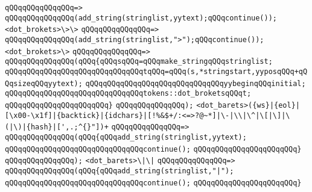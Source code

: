 \verb|qQQqqQQqqQQqqQQq=>|\newline
\verb|qQQqqQQqqQQqqQQq(add_string(stringlist,yytext);qQQqcontinue());|\newline
\newline
\verb|<dot_brokets>\>\>|\newline
\verb|qQQqqQQqqQQqqQQq=>|\newline
\verb|qQQqqQQqqQQqqQQq(add_string(stringlist,">");qQQqcontinue());|\newline
\newline
\verb|<dot_brokets>\>|\newline
\verb|qQQqqQQqqQQqqQQq=>|\newline
\verb|qQQqqQQqqQQqqQQq(qQQq{qQQqsqQQq=qQQqmake_stringqQQqstringlist;|\newline
\verb|qQQqqQQqqQQqqQQqqQQqqQQqqQQqqQQqtqQQq=qQQq(s,*stringstart,yyposqQQq+qQQqsizeqQQqyytext);|\newline
\verb|qQQqqQQqqQQqqQQqqQQqqQQqqQQqqQQqyybeginqQQqinitial;|\newline
\verb|qQQqqQQqqQQqqQQqqQQqqQQqqQQqqQQqtokens::dot_broketsqQQqt;|\newline
\verb|qQQqqQQqqQQqqQQqqQQqqQQq}|\newline
\verb|qQQqqQQqqQQqqQQq);|\newline
\newline
\newline
\newline
\verb|<dot_barets>({ws}|\verb#|{eol}|[\x00-\x1f]|{backtick}|{idchars}|[!%&$+/:<=>?@~*]|\-|\\|\^|\[|\]|\(|\)|{hash}|[',.;^{}"])+#\newline
\verb|qQQqqQQqqQQqqQQq=>|\newline
\verb|qQQqqQQqqQQqqQQq(qQQq{qQQqadd_string(stringlist,yytext);|\newline
\verb|qQQqqQQqqQQqqQQqqQQqqQQqqQQqqQQqcontinue();|\newline
\verb|qQQqqQQqqQQqqQQqqQQqqQQq}|\newline
\verb|qQQqqQQqqQQqqQQq);|\newline
\newline
\verb|<dot_barets>\|\verb#|\|#\newline
\verb|qQQqqQQqqQQqqQQq=>|\newline
\verb|qQQqqQQqqQQqqQQq(qQQq{qQQqadd_string(stringlist,"|\verb#|");#\newline
\verb|qQQqqQQqqQQqqQQqqQQqqQQqqQQqqQQqcontinue();|\newline
\verb|qQQqqQQqqQQqqQQqqQQqqQQq}|\newline
